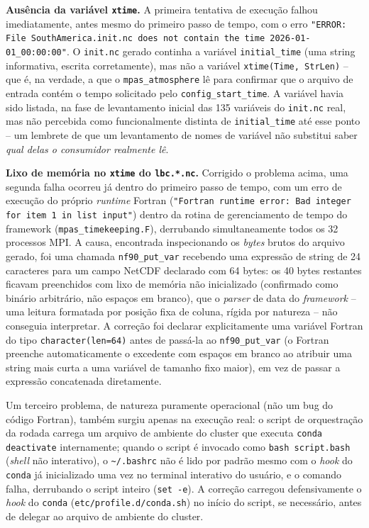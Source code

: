 \begin{caixaachado}
\textbf{Ausência da variável \texttt{xtime}.} A primeira tentativa de
execução falhou imediatamente, antes mesmo do primeiro passo de tempo,
com o erro \texttt{"ERROR: File SouthAmerica.init.nc does not contain
the time 2026-01-01\_00:00:00"}. O \texttt{init.nc} gerado continha a
variável \texttt{initial\_time} (uma string informativa, escrita
corretamente), mas não a variável \texttt{xtime(Time, StrLen)} -- que é,
na verdade, a que o \texttt{mpas\_atmosphere} lê para confirmar que o
arquivo de entrada contém o tempo solicitado pelo
\texttt{config\_start\_time}. A variável havia sido listada, na fase de
levantamento inicial das 135 variáveis do \texttt{init.nc} real, mas não
percebida como funcionalmente distinta de \texttt{initial\_time} até
esse ponto -- um lembrete de que um levantamento de nomes de variável não
substitui saber \emph{qual delas o consumidor realmente lê}.

\textbf{Lixo de memória no \texttt{xtime} do \texttt{lbc.*.nc}.} Corrigido
o problema acima, uma segunda falha ocorreu já dentro do primeiro passo
de tempo, com um erro de execução do próprio \emph{runtime} Fortran
(\texttt{"Fortran runtime error: Bad integer for item 1 in list input"})
dentro da rotina de gerenciamento de tempo do framework
(\texttt{mpas\_timekeeping.F}), derrubando simultaneamente todos os 32
processos MPI. A causa, encontrada inspecionando os \emph{bytes} brutos
do arquivo gerado, foi uma chamada \texttt{nf90\_put\_var} recebendo uma
expressão de string de 24 caracteres para um campo NetCDF declarado com
64 bytes: os 40 bytes restantes ficavam preenchidos com lixo de memória
não inicializado (confirmado como binário arbitrário, não espaços em
branco), que o \emph{parser} de data do \textit{framework} -- uma leitura
formatada por posição fixa de coluna, rígida por natureza -- não
conseguia interpretar. A correção foi declarar explicitamente uma
variável Fortran do tipo \texttt{character(len=64)} antes de passá-la ao
\texttt{nf90\_put\_var} (o Fortran preenche automaticamente o excedente
com espaços em branco ao atribuir uma string mais curta a uma variável de
tamanho fixo maior), em vez de passar a expressão concatenada
diretamente.
\end{caixaachado}

Um terceiro problema, de natureza puramente operacional (não um bug do
código Fortran), também surgiu apenas na execução real: o script de
orquestração da rodada carrega um arquivo de ambiente do cluster que
executa \texttt{conda deactivate} internamente; quando o script é
invocado como \texttt{bash script.bash} (\emph{shell} não interativo), o
\texttt{\textasciitilde/.bashrc} não é lido por padrão mesmo com o
\textit{hook} do \texttt{conda} já inicializado uma vez no terminal
interativo do usuário, e o comando falha, derrubando o script inteiro
(\texttt{set -e}). A correção carregou defensivamente o \textit{hook} do
\texttt{conda} (\texttt{etc/profile.d/conda.sh}) no início do script, se
necessário, antes de delegar ao arquivo de ambiente do cluster.


